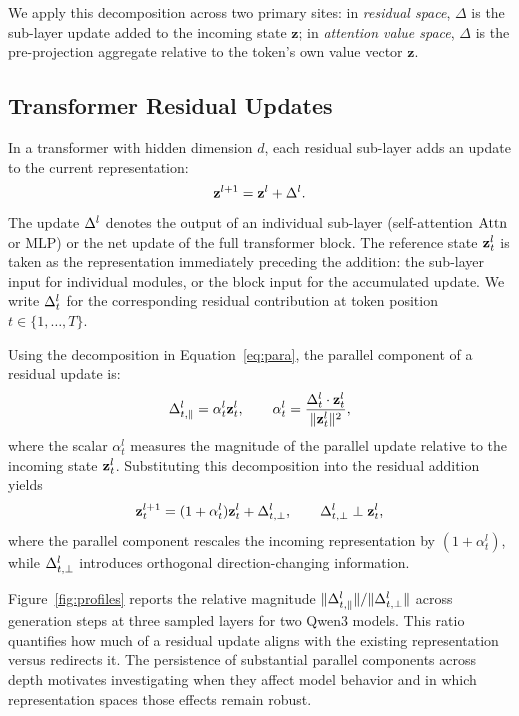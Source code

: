 We apply this decomposition across two primary sites: in
\textit{residual space}, $\Delta$ is the sub-layer update added to the incoming
state $\mathbf{z}$; in \textit{attention value space}, $\Delta$ is the
pre-projection aggregate relative to the token's own value vector $\mathbf{z}$.

\subsection{Transformer Residual Updates}
\label{sec:transformer}

In a transformer with hidden dimension $d$, each residual sub-layer adds an update to the current representation:
\begin{equation}
  \mathbf{z}^{l+1} = \mathbf{z}^{l} + \Delta^{l}.
  \label{eq:residual}
\end{equation}
The update $\Delta^{l}$ denotes the output of an individual sub-layer
(self-attention $\mathrm{Attn}$ or $\mathrm{MLP}$) or the net update of the full
transformer block. The reference state $\mathbf{z}^{l}_{t}$ is taken as the
representation immediately preceding the addition: the sub-layer input for
individual modules, or the block input for the accumulated update. We write
$\Delta^{l}_{t}$ for the corresponding residual contribution at token position
$t \in \{1,\ldots,T\}$.

Using the decomposition in Equation~\ref{eq:para}, the parallel component of a residual update is:
\begin{equation}
  \Delta^{l}_{t,\parallel} = \alpha^l_t \mathbf{z}^{l}_{t}, \qquad
  \alpha^l_t = \frac{\Delta^{l}_{t}\cdot \mathbf{z}^{l}_{t}}{\|\mathbf{z}^{l}_{t}\|^2},
\end{equation}
where the scalar $\alpha^l_t$ measures the magnitude of the parallel update relative to the incoming state $\mathbf{z}^{l}_{t}$. Substituting this decomposition into the residual addition yields
\begin{equation}
  \mathbf{z}^{l+1}_{t}
  = (1+\alpha^l_t)\mathbf{z}^{l}_{t} + \Delta^{l}_{t,\perp}, \qquad
  \Delta^{l}_{t,\perp}\perp \mathbf{z}^{l}_{t},
\end{equation}
where the parallel component rescales the incoming representation by $(1+\alpha^l_t)$, while $\Delta^{l}_{t,\perp}$ introduces orthogonal direction-changing information.

Figure~\ref{fig:profiles} reports the relative magnitude $\|\Delta^{l}_{t,\parallel}\|/\|\Delta^{l}_{t,\perp}\|$ across generation steps at three sampled layers for two Qwen3 models. This ratio quantifies how much of a residual update aligns with the existing representation versus redirects it. The persistence of substantial parallel components across depth motivates investigating when they affect model behavior and in which representation spaces those effects remain robust.

